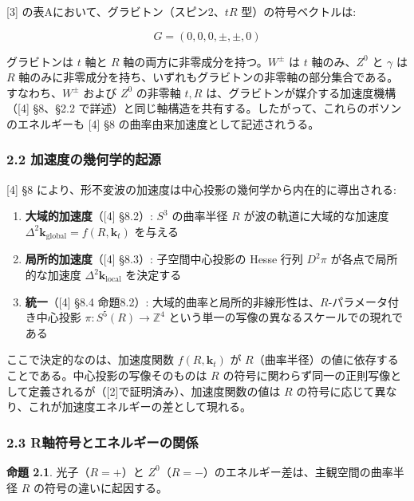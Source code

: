\documentclass[
  a4paper,11pt]{ltjsarticle}
\theoremstyle{definition}
\theoremstyle{remark}
\begin{document}
{[}3{]} の表Aにおいて、グラビトン（スピン2、\(tR\) 型）の符号ベクトルは:

\[G = (0, 0, 0, \pm, \pm, 0)\]

グラビトンは \(t\) 軸と \(R\) 軸の両方に非零成分を持つ。\(W^{\pm}\) は
\(t\) 軸のみ、\(Z^0\) と \(\gamma\) は \(R\)
軸のみに非零成分を持ち、いずれもグラビトンの非零軸の部分集合である。すなわち、\(W^{\pm}\)
および \(Z^0\) の非零軸 \(t, R\)
は、グラビトンが媒介する加速度機構（{[}4{]} §8、§2.2
で詳述）と同じ軸構造を共有する。したがって、これらのボソンのエネルギーも
{[}4{]} §8 の曲率由来加速度として記述されうる。

\subsubsection{2.2
加速度の幾何学的起源}\label{ux52a0ux901fux5ea6ux306eux5e7eux4f55ux5b66ux7684ux8d77ux6e90}

{[}4{]} §8
により、形不変波の加速度は中心投影の幾何学から内在的に導出される:

\begin{enumerate}
\def\labelenumi{(\roman{enumi})}
\item
  \textbf{大域的加速度}（{[}4{]} §8.2）: \(S^3\) の曲率半径 \(R\)
  が波の軌道に大域的な加速度
  \(\Delta^2\mathbf{k}_{\text{global}} = f(R, \mathbf{k}_t)\) を与える
\item
  \textbf{局所的加速度}（{[}4{]} §8.3）: 子空間中心投影の Hesse 行列
  \(D^2\pi\) が各点で局所的な加速度
  \(\Delta^2\mathbf{k}_{\text{local}}\) を決定する
\item
  \textbf{統一}（{[}4{]} §8.4 命題8.2）:
  大域的曲率と局所的非線形性は、\(R\)-パラメータ付き中心投影
  \(\pi: S^5(R) \to \mathbb{Z}^4\)
  という単一の写像の異なるスケールでの現れである
\end{enumerate}

ここで決定的なのは、加速度関数 \(f(R, \mathbf{k}_t)\) が
\(R\)（曲率半径）の値に依存することである。中心投影の写像そのものは
\(R\)
の符号に関わらず同一の正則写像として定義されるが（{[}2{]}で証明済み）、加速度関数の値は
\(R\) の符号に応じて異なり、これが加速度エネルギーの差として現れる。

\subsubsection{2.3
R軸符号とエネルギーの関係}\label{rux8ef8ux7b26ux53f7ux3068ux30a8ux30cdux30ebux30aeux30fcux306eux95a2ux4fc2}

\textbf{命題 2.1}. 光子（\(R = +\)）と
\(Z^0\)（\(R = -\)）のエネルギー差は、主観空間の曲率半径 \(R\)
の符号の違いに起因する。
\end{document}
